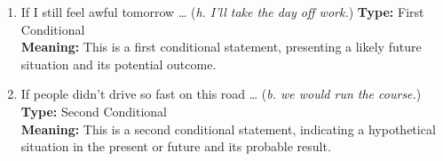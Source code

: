 \begin{enumerate}
      \item If I still feel awful tomorrow … (\textit{h. I’ll take the day off work.})
            \textbf{Type:} First Conditional \\
            \textbf{Meaning:} This is a first conditional statement, presenting a likely future situation and its potential outcome.

      \item If people didn’t drive so fast on this road … (\textit{b. we would run the course.})
            \textbf{Type:} Second Conditional \\
            \textbf{Meaning:} This is a second conditional statement, indicating a hypothetical situation in the present or future and its probable result.
\end{enumerate}

